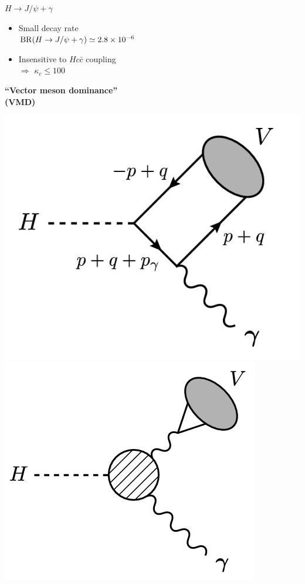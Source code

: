 \documentclass[aspectratio=169]{beamer}
\begin{document}
\begin{frame}
	\begin{columns}
		\begin{column}{0.45\textwidth}
			\textcolor{PittRoyal}{\bf $H\to J/\psi + \gamma$}
			\begin{itemize}
				\item Small decay rate\\
				\vspace{-2mm}\hspace{3mm}${\rm BR}(H\to J/\psi + \gamma)\simeq 2.8\times 10^{-6}$
				\item Insensitive to $Hc\bar{c}$ coupling \\
				\hspace{3mm}$\Rightarrow$ {\bf $\kappa_c\leq 100$}
			\end{itemize}
			\vspace{6mm}
			\hspace{3mm}\textcolor{PittRoyal}{\bf ``Vector meson dominance''}\\
			\hspace{40mm}\textcolor{PittRoyal}{\bf (VMD)}
			\vspace{2mm}
			\begin{center}
				\includegraphics[width=.4\textwidth]{figs/HJpsigm.png}
				\includegraphics[width=.4\textwidth]{figs/HJpsigm2.png}
			\end{center}


\end{column}
\end{columns}
\end{frame}
\end{document}
